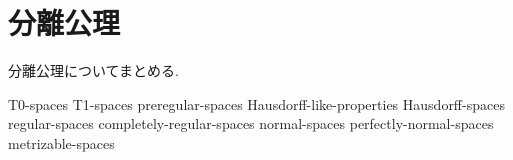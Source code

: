 \documentclass[uplatex, dvipdfmx, a4paper, 12pt, class=jsbook, crop=false]{standalone}
\begin{document}
\chapter{分離公理}
\label{chap:separation-axioms}

分離公理についてまとめる.

{T0-spaces}
{T1-spaces}
{preregular-spaces}
{Hausdorff-like-properties}
{Hausdorff-spaces}
{regular-spaces}
{completely-regular-spaces}
{normal-spaces}
{perfectly-normal-spaces}
{metrizable-spaces}
\end{document}
